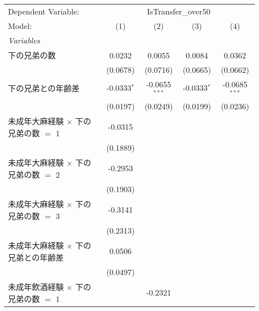 \documentclass{article}
\begin{document}
\begin{landscape}


\begingroup
\centering
\begin{threeparttable}[b]
   \begin{tabular}{lcccc}
      \tabularnewline \midrule \midrule
      Dependent Variable: & \multicolumn{4}{c}{IsTransfer\_over50}\\
      Model:                                              & (1)           & (2)             & (3)           & (4)\\  
      \midrule
      \emph{Variables}\\
      下の兄弟の数                                        & 0.0232        & 0.0055          & 0.0084        & 0.0362\\   
                                                          & (0.0678)      & (0.0716)        & (0.0665)      & (0.0662)\\   
      下の兄弟との年齢差                                  & -0.0333$^{*}$ & -0.0655$^{***}$ & -0.0333$^{*}$ & -0.0685$^{***}$\\   
                                                          & (0.0197)      & (0.0249)        & (0.0199)      & (0.0236)\\   
      未成年大麻経験 $\times$ 下の兄弟の数 $=$ 1          & -0.0315       &                 &               &   \\   
                                                          & (0.1889)      &                 &               &   \\   
      未成年大麻経験 $\times$ 下の兄弟の数 $=$ 2          & -0.2953       &                 &               &   \\   
                                                          & (0.1903)      &                 &               &   \\   
      未成年大麻経験 $\times$ 下の兄弟の数 $=$ 3          & -0.3141       &                 &               &   \\   
                                                          & (0.2313)      &                 &               &   \\   
      未成年大麻経験 $\times$ 下の兄弟との年齢差          & 0.0506        &                 &               &   \\   
                                                          & (0.0497)      &                 &               &   \\   
      未成年飲酒経験 $\times$ 下の兄弟の数 $=$ 1          &               & -0.2321         &               &   \\   

\end{tabular}
\end{threeparttable}
\end{landscape}
\end{document}
